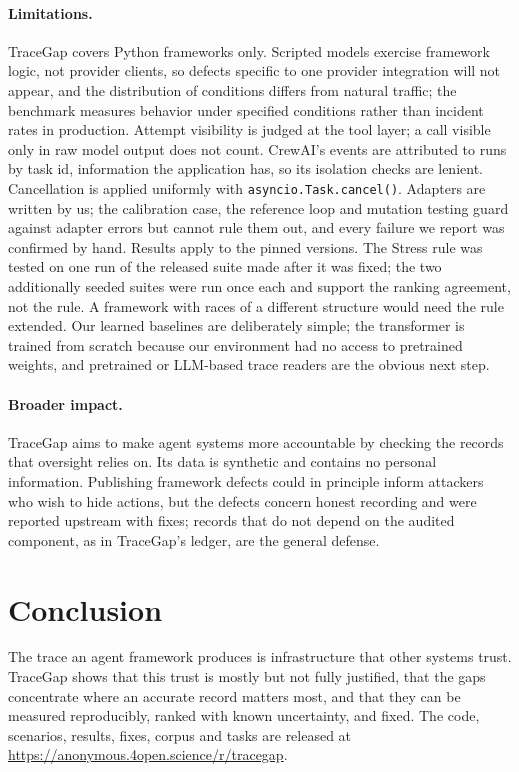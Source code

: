 \documentclass[10pt]{article}
\newcommand{\codeurl}{\url{https://anonymous.4open.science/r/tracegap}}
\begin{document}
\paragraph{Limitations.} TraceGap covers Python frameworks only. Scripted models exercise framework logic, not provider clients, so defects specific to one provider integration will not appear, and the distribution of conditions differs from natural traffic; the benchmark measures behavior under specified conditions rather than incident rates in production. Attempt visibility is judged at the tool layer; a call visible only in raw model output does not count. CrewAI's events are attributed to runs by task id, information the application has, so its isolation checks are lenient. Cancellation is applied uniformly with \texttt{asyncio.Task.cancel()}. Adapters are written by us; the calibration case, the reference loop and mutation testing guard against adapter errors but cannot rule them out, and every failure we report was confirmed by hand. Results apply to the pinned versions. The Stress rule was tested on one run of the released suite made after it was fixed; the two additionally seeded suites were run once each and support the ranking agreement, not the rule. A framework with races of a different structure would need the rule extended. Our learned baselines are deliberately simple; the transformer is trained from scratch because our environment had no access to pretrained weights, and pretrained or LLM-based trace readers are the obvious next step.

\paragraph{Broader impact.} TraceGap aims to make agent systems more accountable by checking the records that oversight relies on. Its data is synthetic and contains no personal information. Publishing framework defects could in principle inform attackers who wish to hide actions, but the defects concern honest recording and were reported upstream with fixes; records that do not depend on the audited component, as in TraceGap's ledger, are the general defense.

\section{Conclusion}
The trace an agent framework produces is infrastructure that other systems trust. TraceGap shows that this trust is mostly but not fully justified, that the gaps concentrate where an accurate record matters most, and that they can be measured reproducibly, ranked with known uncertainty, and fixed. The code, scenarios, results, fixes, corpus and tasks are released at \codeurl.
\end{document}
